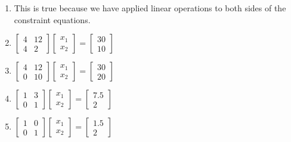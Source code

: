 \documentclass{article}
\begin{document}
\begin{enumerate}
	\item This is true because we have applied linear operations to both sides of the constraint equations. 
	
	\item $
	\begin{bmatrix}
		4	&12\\
		4	&2
	\end{bmatrix}
	\begin{bmatrix}
		x_1\\
		x_2
	\end{bmatrix}
	= 
	\begin{bmatrix}
		30\\
		10
	\end{bmatrix}
	$
	
	\item $
	\begin{bmatrix}
		4	&12\\
		0	&10
	\end{bmatrix}
	\begin{bmatrix}
		x_1\\
		x_2
	\end{bmatrix}
	= 
	\begin{bmatrix}
		30\\
		20
	\end{bmatrix}
	$
	
	\item $
	\begin{bmatrix}
		1	&3\\
		0	&1
	\end{bmatrix}
	\begin{bmatrix}
		x_1\\
		x_2
	\end{bmatrix}
	= 
	\begin{bmatrix}
		7.5\\
		2
	\end{bmatrix}
	$
	
	\item $
	\begin{bmatrix}
		1	&0\\
		0	&1
	\end{bmatrix}
	\begin{bmatrix}
		x_1\\
		x_2
	\end{bmatrix}
	= 
	\begin{bmatrix}
		1.5\\
		2
	\end{bmatrix}
	$
	

\end{enumerate}
\end{document}
